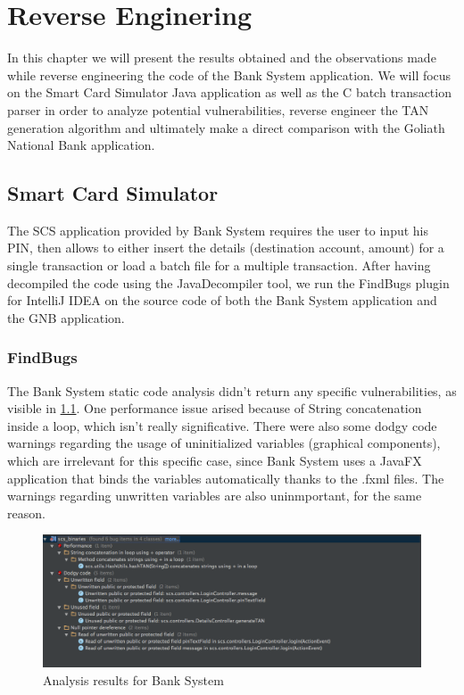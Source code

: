 \chapter{Reverse Enginering}\label{chapter:reverse_engineering}
In this chapter we will present the results obtained and the observations made while reverse engineering the code of the Bank System application.
We will focus on the Smart Card Simulator Java application as well as the C batch transaction parser in order to analyze potential vulnerabilities, reverse engineer the TAN generation algorithm and ultimately make a direct comparison with the Goliath National Bank application.

\section{Smart Card Simulator}
The SCS application provided by Bank System requires the user to input his PIN, then allows to either insert the details (destination account, amount) for a single transaction or load a batch file for a multiple transaction.\newline
After having decompiled the code using the JavaDecompiler tool, we run the FindBugs plugin for IntelliJ IDEA on the source code of both the Bank System application and the GNB application.\newline

\subsection{FindBugs}
The Bank System static code analysis didn't return any specific vulnerabilities, as visible in \ref{figure:bs_findBugs}.\newline
One performance issue arised because of String concatenation inside a loop, which isn't really significative. There were also some dodgy code warnings regarding the usage of uninitialized variables (graphical components), which are irrelevant for this specific case, since Bank System uses a JavaFX application that binds the variables automatically thanks to the .fxml files. The warnings regarding unwritten variables are also uninmportant, for the same reason.

\begin{figure}[h!tbp]
	\centering
	\includegraphics[width=\textwidth]{figures/bs_findBugs}
	\caption{Analysis results for Bank System}
	\label{figure:bs_findBugs}
\end{figure}

